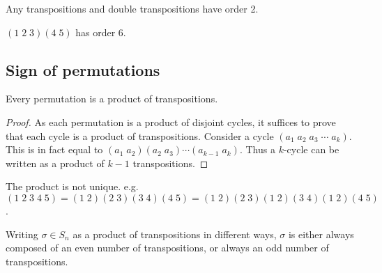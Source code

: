 \documentclass[a4paper]{article}
\begin{document}
  \begin{eg}
    Any transpositions and double transpositions have order 2.

    $(1\; 2\; 3)(4\; 5)$ has order 6.
  \end{eg}

  \subsection{Sign of permutations}
  \begin{prop}
    Every permutation is a product of transpositions.
  \end{prop}

  \begin{proof}
    As each permutation is a product of disjoint cycles, it suffices to prove that each cycle is a product of transpositions. Consider a cycle $(a_1\; a_2\; a_3\; \cdots\; a_k)$. This is in fact equal to $(a_1\; a_2)(a_2\; a_3)\cdots (a_{k-1}\; a_k)$. Thus a $k$-cycle can be written as a product of $k - 1$ transpositions.
  \end{proof}

  \note The product is not unique. e.g. $(1\; 2\; 3\; 4\; 5) =(1\; 2)(2\; 3)(3\; 4)(4\; 5) = (1\; 2)(2\; 3)(1\; 2)(3\; 4)(1\; 2)(4\; 5)$.

  \begin{thm}
    Writing $\sigma\in S_n$ as a product of transpositions in different ways, $\sigma$ is either always composed of an even number of transpositions, or always an odd number of transpositions.
  \end{thm}
\end{document}

